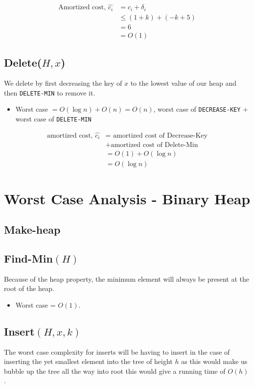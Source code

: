 \documentclass[a4paper,oneside,11pt]{article}
\begin{document}
\begin{align*}
  \text{Amortized cost, }\hat{c_i} &= c_i + \delta_i\\
  &\leq (1+k)+(-k+5)\\
  &= 6\\
  &= O(1)
\end{align*}
\subsection*{Delete($H, x$)}
We delete by first decreasing the key of $x$ to the lowest value of our heap and then \texttt{DELETE-MIN} to remove it.

\begin{itemize}
\item{Worst case} $= O(\log n) + O(n) = O(n)$, worst case of \texttt{DECREASE-KEY} + worst case of \texttt{DELETE-MIN}
\end{itemize}

\begin{align*}
\text{amortized cost, } \hat{c_i} &= \text{ amortized cost of Decrease-Key}\\
&+\text{amortized cost of Delete-Min}\\
&= O(1) + O(\log n)\\
&= O(\log n)
\end{align*}

\section*{Worst Case Analysis - Binary Heap}
\subsection*{Make-heap}


\subsection*{Find-Min$(H)$}
Because of the heap property, the minimum element will always be present at the root of the heap.

\begin{itemize}
\item{Worst case} = $O(1)$.
\end{itemize}

\subsection*{Insert$(H,x,k)$}
The worst case complexity for inserts will be having to insert in the case of inserting the yet smallest element into the tree of height $h$ as this would make us bubble up the tree all the way into root this would give a running time of $O(h)$.
\end{document}
